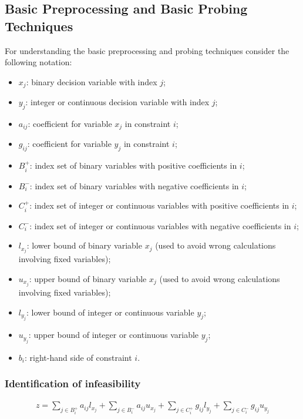 \documentclass[preprint,12pt]{elsarticle}
\begin{document}
\subsection{Basic Preprocessing and Basic Probing Techniques}

For understanding the basic preprocessing and probing techniques consider the following notation:

\begin{itemize}
\item \textbf{$x_j$}: binary decision variable with index $j$;
\item \textbf{$y_j$}: integer or continuous decision variable with index $j$;
\item \textbf{$a_{ij}$}: coefficient for variable $x_{j}$ in constraint $i$;
\item \textbf{$g_{ij}$}: coefficient for variable $y_{j}$ in constraint $i$;
\item \textbf{$B_i^+$}: index set of binary variables with positive coefficients in $i$;
\item \textbf{$B_i^-$}: index set of binary variables with negative coefficients in $i$;
\item \textbf{$C_i^+$}: index set of integer or continuous variables with positive coefficients in $i$;
\item \textbf{$C_i^-$}: index set of integer or continuous variables with negative coefficients in $i$;
\item \textbf{$l_{x_j}$}: lower bound of binary variable $x_j$ (used to avoid wrong calculations involving fixed variables);
\item \textbf{$u_{x_j}$}: upper bound of binary variable $x_j$ (used to avoid wrong calculations involving fixed variables);
\item \textbf{$l_{y_j}$}: lower bound of integer or continuous variable $y_j$;
\item \textbf{$u_{y_j}$}: upper bound of integer or continuous variable $y_j$;
\item \textbf{$b_i$}: right-hand side of constraint $i$.

\end{itemize}

\subsubsection{Identification of infeasibility}

\begin{align}
	z = \sum_{j \in B_i^+}{a_{ij}l_{x_j}} + \sum_{j \in B_i^-}{a_{ij}u_{x_j}} + \sum_{j \in C_i^+}{g_{ij}l_{y_j}} + \sum_{j \in C_i^-}{g_{ij}u_{y_j}}
\end{align}
\end{document}
